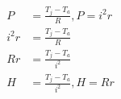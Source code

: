 \documentclass[12pt]{article}
\begin{document}
\begin{align*}
P &= \frac{T_j - T_a}{R}, P = i^2r\\
i^2r &= \frac{T_j - T_a}{R}\\
Rr &= \frac{T_j - T_a}{i^2}\\
H &= \frac{T_j - T_a}{i^2}, H = Rr\\
\end{align*}
\end{document}
